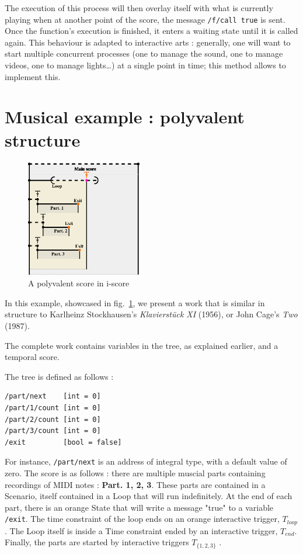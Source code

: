 \documentclass{article}
\begin{document}
The execution of this process will then overlay itself with what is currently playing when at another point of the score, 
the message \lstinline{/f/call true} is sent.
Once the function's execution is finished, it enters a waiting state until it is called again.
This behaviour is adapted to interactive arts : generally, one will want to start multiple 
concurrent processes (one to manage the sound, one to manage videos, one to manage lights\dots) at a single point in time; this method allows to implement this.

\section{Musical example : polyvalent structure}
\begin{figure}
    \centering
    \includegraphics[width=0.45\textwidth]{images/partition.eps}
    \caption{A polyvalent score in i-score}
    \label{fig.polyvalent}
\end{figure}

In this example, showcased in fig.~\ref{fig.polyvalent}, we present a work that is similar in structure to Karlheinz Stockhausen's \emph{Klavierstück XI} (1956), or John Cage's \emph{Two} (1987). 

The complete work contains variables in the tree, as explained earlier, and a temporal score.

The tree is defined as follows : 
\begin{lstlisting}
/part/next    [int = 0]
/part/1/count [int = 0]
/part/2/count [int = 0]
/part/3/count [int = 0]
/exit         [bool = false]
\end{lstlisting}
For instance, \lstinline{/part/next} is an address of integral type, with a default value of zero. 
The score is as follows : there are multiple muscial parts containing recordings of MIDI notes : \textbf{Part. 1, 2, 3}.
These parts are contained in a Scenario, itself contained in a Loop that will run indefinitely. 
At the end of each part, there is an orange State that will write a message "true" to a variable \lstinline{/exit}.
The time constraint of the loop ends on an orange interactive trigger, $T_{loop}$.
The Loop itself is inside a Time constraint ended by an interactive trigger, $T_{end}$.
Finally, the parts are started by interactive triggers  $T_{\{1, 2, 3\}}$ .
\end{document}
